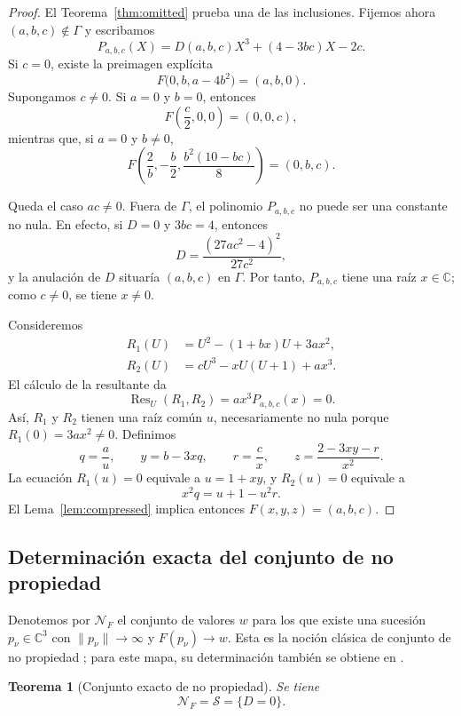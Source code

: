 \documentclass[11pt]{article}
\newtheorem{theorem}{Teorema}[section]
\theoremstyle{definition}
\theoremstyle{remark}
\newcommand{\C}{\mathbb{C}}
\begin{document}
\begin{proof}
El Teorema~\ref{thm:omitted} prueba una de las inclusiones. Fijemos ahora
$(a,b,c)\notin\Gamma$ y escribamos
\[
P_{a,b,c}(X)=D(a,b,c)X^3+(4-3bc)X-2c.
\]
Si $c=0$, existe la preimagen expl\'icita
\[
F\bigl(0,b,a-4b^2\bigr)=(a,b,0).
\]
Supongamos $c\neq0$. Si $a=0$ y $b=0$, entonces
\[
F\left(\frac c2,0,0\right)=(0,0,c),
\]
mientras que, si $a=0$ y $b\neq0$,
\[
F\left(\frac2b,-\frac b2,\frac{b^2(10-bc)}8\right)=(0,b,c).
\]

Queda el caso $ac\neq0$. Fuera de $\Gamma$, el polinomio $P_{a,b,c}$ no puede
ser una constante no nula. En efecto, si $D=0$ y $3bc=4$, entonces
\[
D=\frac{(27ac^2-4)^2}{27c^2},
\]
y la anulaci\'on de $D$ situar\'ia $(a,b,c)$ en $\Gamma$. Por tanto,
$P_{a,b,c}$ tiene una ra\'iz $x\in\C$; como $c\neq0$, se tiene $x\neq0$.

Consideremos
\begin{align*}
R_1(U)&=U^2-(1+bx)U+3ax^2,\\
R_2(U)&=cU^3-xU(U+1)+ax^3.
\end{align*}
El c\'alculo de la resultante da
\begin{equation}\label{eq:resultant-u}
\operatorname{Res}_U(R_1,R_2)=ax^3P_{a,b,c}(x)=0.
\end{equation}
As\'i, $R_1$ y $R_2$ tienen una ra\'iz com\'un $u$, necesariamente no nula
porque $R_1(0)=3ax^2\neq0$. Definimos
\[
q=\frac au,\qquad
y=b-3xq,\qquad
r=\frac cx,\qquad
z=\frac{2-3xy-r}{x^2}.
\]
La ecuaci\'on $R_1(u)=0$ equivale a $u=1+xy$, y $R_2(u)=0$ equivale a
\[
x^2q=u+1-u^2r.
\]
El Lema~\ref{lem:compressed} implica entonces $F(x,y,z)=(a,b,c)$.
\end{proof}

\subsection{Determinaci\'on exacta del conjunto de no propiedad}

Denotemos por $\mathcal N_F$ el conjunto de valores $w$ para los que existe
una sucesi\'on $p_\nu\in\C^3$ con
$\lVert p_\nu\rVert\to\infty$ y $F(p_\nu)\to w$. Esta es la noci\'on cl\'asica
de conjunto de no propiedad \cite{Jelonek1993}; para este mapa, su
determinaci\'on tambi\'en se obtiene en \cite{CounterexampleNote2026}.

\begin{theorem}[Conjunto exacto de no propiedad]\label{thm:nonproperness}
Se tiene
\[
\mathcal N_F=\mathcal S=\{D=0\}.
\]
\end{theorem}
\end{document}
